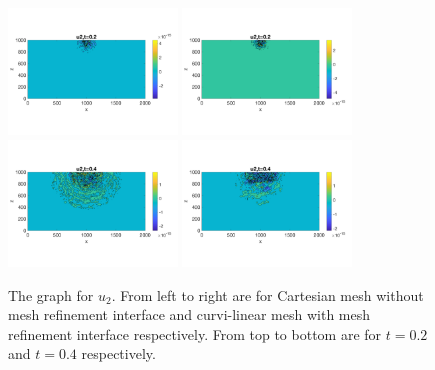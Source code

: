 \begin{figure}[htbp]
	\centering
	\includegraphics[width=0.4\textwidth,trim={0 2.8cm 0 2.8cm}, clip]{u2_t02_cartesian.png}
	\includegraphics[width=0.4\textwidth,trim={0 2.8cm 0 2.8cm}, clip]{u2_t02_curvi_mr.png}\\
	\includegraphics[width=0.4\textwidth,trim={0 2.8cm 0 2.8cm}, clip]{u2_t04_cartesian.png}
	\includegraphics[width=0.4\textwidth,trim={0 2.8cm 0 2.8cm}, clip]{u2_t04_curvi_mr.png}
	\caption{The graph for $u_2$. From left to right are for Cartesian mesh without mesh refinement interface and curvi-linear mesh with mesh refinement interface respectively. From top to bottom are for $t = 0.2$ and $t = 0.4$ respectively.}\label{u2}
\end{figure}

